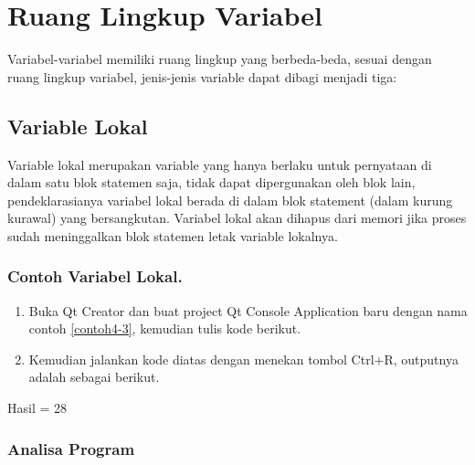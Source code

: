 \section{Ruang Lingkup Variabel}\label{ruang-lingkup-variabel}

Variabel-variabel memiliki ruang lingkup yang berbeda-beda, sesuai
dengan ruang lingkup variabel, jenis-jenis variable dapat dibagi menjadi
tiga:

\subsection{Variable Lokal}\label{variable-lokal}

Variable lokal merupakan variable yang hanya berlaku untuk pernyataan di
dalam satu blok statemen saja, tidak dapat dipergunakan oleh blok lain,
pendeklarasianya variabel lokal berada di dalam blok statement (dalam
kurung kurawal) yang bersangkutan. Variabel lokal akan dihapus dari
memori jika proses sudah meninggalkan blok statemen letak variable
lokalnya.

\subsubsection*{Contoh  Variabel Lokal.}

\begin{enumerate}

\item
  Buka Qt Creator dan buat project Qt Console Application baru dengan
  nama contoh \ref{contoh4-3}, kemudian tulis kode berikut.



\item
  Kemudian jalankan kode diatas dengan menekan tombol Ctrl+R, outputnya
  adalah sebagai berikut.
\end{enumerate}

\begin{lcverbatim}
Hasil = 28
\end{lcverbatim}


\subsubsection*{Analisa Program}

